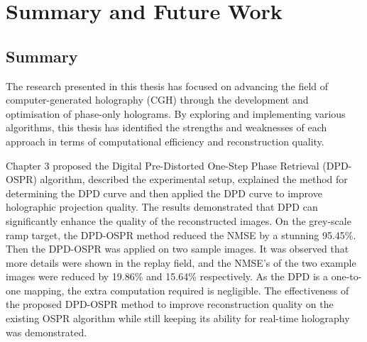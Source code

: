 
\chapter{Summary and Future Work}
\section{Summary}
The research presented in this thesis has focused on advancing the field of computer-generated holography (CGH) through the development and optimisation of phase-only holograms. By exploring and implementing various algorithms, this thesis has identified the strengths and weaknesses of each approach in terms of computational efficiency and reconstruction quality.

Chapter 3 proposed the Digital Pre-Distorted One-Step Phase Retrieval (DPD-OSPR) algorithm, described the experimental setup, explained the method for determining the DPD curve and then applied the DPD curve to improve holographic projection quality. The results demonstrated that DPD can significantly enhance the quality of the reconstructed images. On the grey-scale ramp target, the DPD-OSPR method reduced the NMSE by a stunning 95.45\%. Then the DPD-OSPR was applied on two sample images. It was observed that more details were shown in the replay field, and the NMSE's of the two example images were reduced by 19.86\% and 15.64\% respectively. As the DPD is a one-to-one mapping, the extra computation required is negligible. The effectiveness of the proposed DPD-OSPR method to improve reconstruction quality on the existing OSPR algorithm while still keeping its ability for real-time holography was demonstrated.

